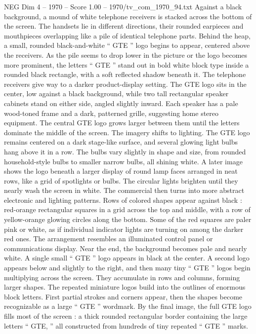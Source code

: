 \begin{textsample}{NEG Dim 4 – 1970 – Score 1.00 – 1970/tv\_com\_1970\_94.txt}  \label{ex:f4_neg_013}
Against a black background, a mound of white telephone receivers is stacked across the bottom of the screen.
The handsets lie in different directions, their rounded earpieces and mouthpieces overlapping like a pile of identical telephone parts.
Behind the heap, a small, rounded black-and-white “ GTE ” logo begins to appear, centered above the receivers.
As the pile seems to drop lower in the picture or the logo becomes more prominent, the letters “ GTE ” stand out in bold white block type inside a rounded black rectangle, with a soft reflected shadow beneath it.
The telephone receivers give way to a darker product-display setting.
The GTE logo sits in the center, low against a black background, while two tall rectangular speaker cabinets stand on either side, angled slightly inward.
Each speaker has a pale wood-toned frame and a dark, patterned grille, suggesting home stereo equipment.
The central GTE logo grows larger between them until the letters dominate the middle of the screen.
The imagery shifts to lighting.
The GTE logo remains centered on a dark stage-like surface, and several glowing light bulbs hang above it in a row.
The bulbs vary slightly in shape and size, from rounded household-style bulbs to smaller narrow bulbs, all shining white.
A later image shows the logo beneath a larger display of round lamp faces arranged in neat rows, like a grid of spotlights or bulbs.
The circular lights brighten until they nearly wash the screen in white.
The commercial then turns into more abstract electronic and lighting patterns.
Rows of colored shapes appear against black : red-orange rectangular squares in a grid across the top and middle, with a row of yellow-orange glowing circles along the bottom.
Some of the red squares are paler pink or white, as if individual indicator lights are turning on among the darker red ones.
The arrangement resembles an illuminated control panel or communications display.
Near the end, the background becomes pale and nearly white.
A single small “ GTE ” logo appears in black at the center.
A second logo appears below and slightly to the right, and then many tiny “ GTE ” logos begin multiplying across the screen.
They accumulate in rows and columns, forming larger shapes.
The repeated miniature logos build into the outlines of enormous block letters.
First partial strokes and corners appear, then the shapes become recognizable as a large “ GTE ” wordmark.
By the final image, the full GTE logo fills most of the screen : a thick rounded rectangular border containing the large letters “ GTE, ” all constructed from hundreds of tiny repeated “ GTE ” marks.

\end{textsample}
